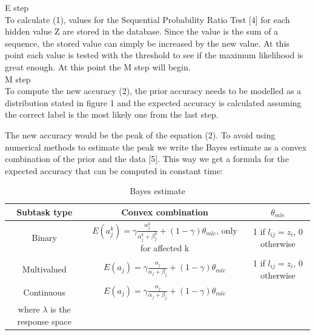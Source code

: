 \documentclass[11pt]{article}
\begin{document}
E step\\

To calculate (1), values for the Sequential Probability Ratio Test [4] for each hidden value Z are stored in the database. Since the value is the sum of a sequence, the stored value can simply be increased by the new value. At this point each value is tested with the threshold to see if the maximum likelihood is great enough. At this point the M step will begin.\\

M step\\

To compute the new accuracy (2), the prior accuracy needs to be modelled as a distribution stated in figure 1 and the expected accuracy is calculated assuming the correct label is the most likely one from the last step.

The new accuracy would be the peak of the equation (2). To avoid using numerical methods to estimate the peak we write the Bayes estimate as a convex combination of the prior and the data [5]. This way we get a formula for the expected accuracy that can be computed in constant time:\\

\begin{table}[htdp]
\caption{Bayes estimate}
\begin{center}
\begin{tabular}{|c|c|c|}
Subtask type & Convex combination & $\theta_{mle}$\\ \hline

Binary & $ E(a_{j}^{k}) = \gamma \frac{\alpha_{j}^{k}}{\alpha_{j}^{k} + \beta_{j}^{k}} +  (1 - \gamma)\theta_{mle}$, only for affected k & 1 if $l_{ij} = z_{i}$, 0 otherwise\\

Multivalued & $ E(a_{j}) = \gamma \frac{\alpha_{j}}{\alpha_{j} + \beta_{j}} +  (1 - \gamma)\theta_{mle}$ &1 if $l_{ij} = z_{i}$, 0 otherwise\\

Continuous & $ E(a_{j}) = \gamma \frac{\alpha_{j}}{\alpha_{j} + \beta_{j}} +  (1 - \gamma)\theta_{mle}$ & \shortstack{$\frac{\mathcal{N}(l_{ij}| z_{i}, \sum)}{\mathcal{N}(l_{ij}| z_{i}, \sum) + \lambda^{-1}}$ \\ where $\lambda$ is the response space}\\
\end{tabular}
\end{center}
\label{def}
\end{table}%
\end{document}
